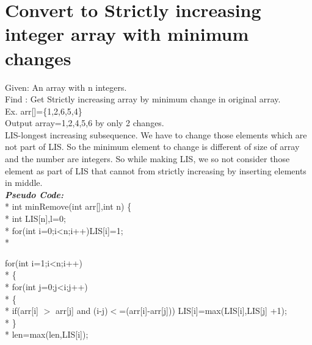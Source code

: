 \documentclass[12pt]{book}
\begin{document}
\chapter{Convert to Strictly increasing integer array with minimum changes}
Given: An array with n integers.\\
\newline
Find : Get Strictly increasing array by minimum change in original array.\\
\newline
Ex. arr[]=\{1,2,6,5,4\} \\
\newline
Output array={1,2,4,5,6} by only 2 changes. \\
\newline
LIS-longest increasing subsequence. We have to change those elements which are not part of LIS. So the minimum element to change is different of size of array and the number are integers. So while making LIS, we so not consider those element as part of LIS that cannot from strictly increasing by inserting elements in middle.\\
\newline
\textbf{\textit{Pseudo Code:}} \\*
int minRemove(int arr[],int n)
\{ \\*
\phantom{x} \hspace{3ex}    int LIS[n],l=0; \\*
\phantom{x} \hspace{3ex}    for(int i=0;i<n;i++)LIS[i]=1;\\*
    
\phantom{x} \hspace{3ex}    for(int i=1;i<n;i++)\\*
\phantom{x} \hspace{3ex}    \{ \\*
\phantom{x} \hspace{3ex} \phantom{x} \hspace{3ex}       for(int j=0;j<i;j++)\\*
\phantom{x} \hspace{3ex} \phantom{x} \hspace{3ex}       \{ \\*
\phantom{x} \hspace{3ex} \phantom{x} \hspace{3ex} \phantom{x} \hspace{3ex}          if(arr[i] $>$ arr[j] and (i-j)$<$=(arr[i]-arr[j])) LIS[i]=max(LIS[i],LIS[j] +1);\\*
\phantom{x} \hspace{3ex} \phantom{x} \hspace{3ex}       \} \\*
\phantom{x} \hspace{3ex}\phantom{x} \hspace{3ex}len=max(len,LIS[i]);
\end{document}
